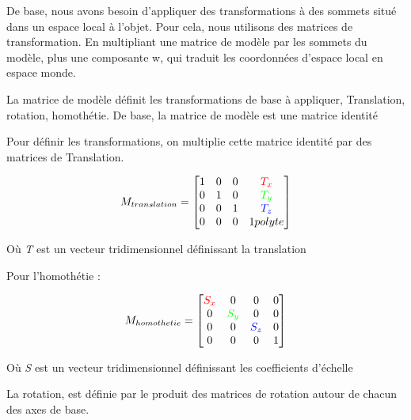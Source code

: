 \documentclass[pdftex, 11pt, a4paper, titlepage]{article}
\begin{document}
De base, nous avons besoin d'appliquer des transformations à des
sommets situé dans un espace local à l'objet.  Pour cela, nous
utilisons des matrices de transformation.  En multipliant une matrice
de modèle par les sommets du modèle, plus une composante w, qui
traduit les coordonnées d'espace local en espace monde.

La matrice de modèle définit les transformations de base à appliquer,
Translation, rotation, homothétie.  De base, la matrice de modèle est
une matrice identité

Pour définir les transformations, on multiplie cette matrice identité
par des matrices de Translation.

\begin{equation*}
M_{translation} =
  \begin{bmatrix}
    1 & 0 & 0 & \color{red}{T_x} \\
    0 & 1 & 0 & \color{green}{T_y} \\
    0 & 0 & 1 & \color{blue}{T_z} \\
    0 & 0 & 0 & 1
polyte  \end{bmatrix}
\end{equation*}

Où \emph{T} est un vecteur tridimensionnel définissant la translation

Pour l'homothétie :

\begin{equation*}
  M_{homothetie} =
  \begin{bmatrix}
    \color{red}{S_x} & 0                  & 0                 & 0 \\
    0                & \color{green}{S_y} & 0                 & 0 \\
    0                & 0                  & \color{blue}{S_z} & 0 \\
    0 & 0 & 0 & 1
  \end{bmatrix}
\end{equation*}

Où \emph{S} est un vecteur tridimensionnel définissant les
coefficients d'échelle

La rotation, est définie par le produit des matrices de rotation
autour de chacun des axes de base.
\end{document}
